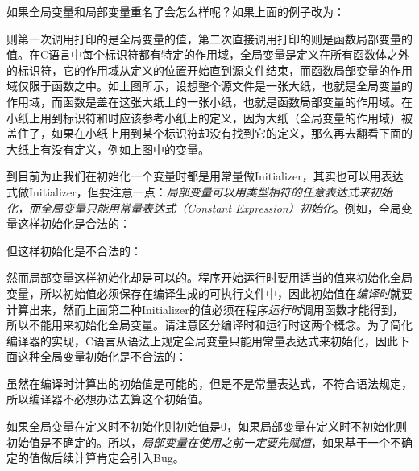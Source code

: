 如果全局变量和局部变量重名了会怎么样呢？如果上面的例子改为：


\begin{BookExampleGraphic}
\end{BookExampleGraphic}


则第一次调用打印的是全局变量的值，第二次直接调用打印的则是函数局部变量的值。在C语言中每个标识符都有特定的作用域，全局变量是定义在所有函数体之外的标识符，它的作用域从定义的位置开始直到源文件结束，而函数局部变量的作用域仅限于函数之中。如上图所示，设想整个源文件是一张大纸，也就是全局变量的作用域，而函数是盖在这张大纸上的一张小纸，也就是函数局部变量的作用域。在小纸上用到标识符和时应该参考小纸上的定义，因为大纸（全局变量的作用域）被盖住了，如果在小纸上用到某个标识符却没有找到它的定义，那么再去翻看下面的大纸上有没有定义，例如上图中的变量。



到目前为止我们在初始化一个变量时都是用常量做Initializer，其实也可以用表达式做Initializer，但要注意一点：\emph{局部变量可以用类型相符的任意表达式来初始化，而全局变量只能用常量表达式（Constant Expression）初始化}。例如，全局变量这样初始化是合法的：




但这样初始化是不合法的：




然而局部变量这样初始化却是可以的。程序开始运行时要用适当的值来初始化全局变量，所以初始值必须保存在编译生成的可执行文件中，因此初始值在\emph{编译时}就要计算出来，然而上面第二种Initializer的值必须在程序\emph{运行时}调用函数才能得到，所以不能用来初始化全局变量。请注意区分编译时和运行时这两个概念。为了简化编译器的实现，C语言从语法上规定全局变量只能用常量表达式来初始化，因此下面这种全局变量初始化是不合法的：




虽然在编译时计算出的初始值是可能的，但是不是常量表达式，不符合语法规定，所以编译器不必想办法去算这个初始值。



如果全局变量在定义时不初始化则初始值是0，如果局部变量在定义时不初始化则初始值是不确定的。所以，\emph{局部变量在使用之前一定要先赋值}，如果基于一个不确定的值做后续计算肯定会引入Bug。



